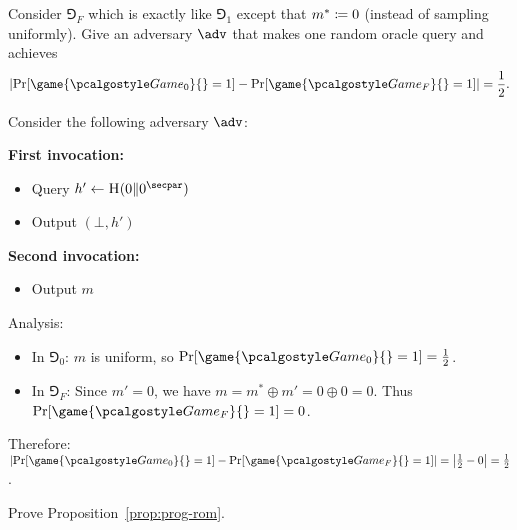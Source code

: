 \begin{exercise}
  Consider $\Game_F$ which is exactly like $\Game_1$ except that $m^* \coloneq 0$ (instead of sampling uniformly). Give an adversary $\adv$ that makes one random oracle query and achieves
  \[
    \left|\Pr[\game{\Game_0}{} = 1] - \Pr[\game{\Game_F}{} = 1]\right| = \frac{1}{2}.
  \]
\end{exercise}

\ifsolutions
\begin{mysolution}
  Consider the following adversary $\adv$:
  
  \textbf{First invocation:}
  \begin{itemize}
    \item Query $h' \gets \pcoracle{H}(0 \| 0^\secpar)$
    \item Output $(\bot, h')$
  \end{itemize}
  
  \textbf{Second invocation:}
  \begin{itemize}
    \item Output $m$
  \end{itemize}
  
  Analysis:
  \begin{itemize}
    \item In $\Game_0$: $m$ is uniform, so $\Pr[\game{\Game_0}{} = 1] = \frac{1}{2}$.
    \item In $\Game_F$: Since $m' = 0$, we have $m = m^* \oplus m' = 0 \oplus 0 = 0$. Thus $\Pr[\game{\Game_F}{} = 1] = 0$.
  \end{itemize}
  
  Therefore: $\left|\Pr[\game{\Game_0}{} = 1] - \Pr[\game{\Game_F}{} = 1]\right| = \left|\frac{1}{2} - 0\right| = \frac{1}{2}$.
\end{mysolution}
\fi

\begin{exercise}
  Prove Proposition~\ref{prop:prog-rom}.
\end{exercise}


